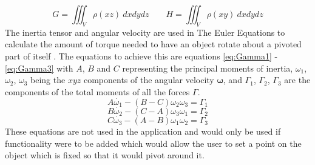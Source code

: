 \begin{equation}\label{eq:GH Triple Integral}
	G=\iiint_{V} \rho(xz)\ dx dy dz
	\qquad
	H=\iiint_{V} \rho(xy)\ dx dy dz
\end{equation}
The inertia tensor and angular velocity are used in The Euler Equations to calculate the amount of torque needed to have an object rotate about a pivoted part of itself \citep{mactaggart2013l8}.
The equations to achieve this are equations \ref{eq:Gamma1} - \ref{eq:Gamma3} with $A$, $B$ and $C$ representing the principal moments of inertia, $\omega_{1}$, $\omega_{2}$, $\omega_{3}$ being the $xyz$ components of the angular velocity $\boldsymbol\omega$, and $\Gamma_{1}$, $\Gamma_{2}$, $\Gamma_{3}$ are the components of the total moments of all the forces $\Gamma$.
\begin{equation}\label{eq:Gamma1}
	A\dot{\omega_{1}} - (B-C)\omega_{2}\omega_{3} = \Gamma_{1}
\end{equation}
\begin{equation}\label{eq:Gamma2}
	B\dot{\omega_{2}} - (C-A)\omega_{3}\omega_{1} = \Gamma_{2}
\end{equation}
\begin{equation}\label{eq:Gamma3}
	C\dot{\omega_{3}} - (A-B)\omega_{1}\omega_{2} = \Gamma_{3}
\end{equation}
These equations are not used in the application and would only be used if functionality were to be added which would allow the user to set a point on the object which is fixed so that it would pivot around it.